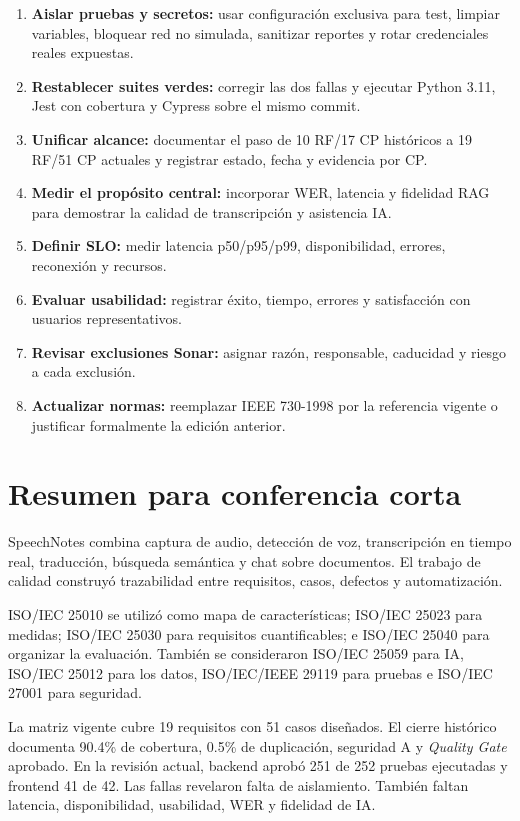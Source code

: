\begin{enumerate}
    \item \textbf{Aislar pruebas y secretos:} usar configuración exclusiva para
    test, limpiar variables, bloquear red no simulada, sanitizar reportes y rotar
    credenciales reales expuestas.
    \item \textbf{Restablecer suites verdes:} corregir las dos fallas y ejecutar
    Python 3.11, Jest con cobertura y Cypress sobre el mismo commit.
    \item \textbf{Unificar alcance:} documentar el paso de 10 RF/17 CP históricos
    a 19 RF/51 CP actuales y registrar estado, fecha y evidencia por CP.
    \item \textbf{Medir el propósito central:} incorporar WER, latencia y fidelidad
    RAG para demostrar la calidad de transcripción y asistencia IA.
    \item \textbf{Definir SLO:} medir latencia p50/p95/p99, disponibilidad,
    errores, reconexión y recursos.
    \item \textbf{Evaluar usabilidad:} registrar éxito, tiempo, errores y
    satisfacción con usuarios representativos.
    \item \textbf{Revisar exclusiones Sonar:} asignar razón, responsable,
    caducidad y riesgo a cada exclusión.
    \item \textbf{Actualizar normas:} reemplazar IEEE 730-1998 por la referencia
    vigente o justificar formalmente la edición anterior.
\end{enumerate}

\section{Resumen para conferencia corta}

SpeechNotes combina captura de audio, detección de voz, transcripción en tiempo
real, traducción, búsqueda semántica y chat sobre documentos. El trabajo de
calidad construyó trazabilidad entre requisitos, casos, defectos y automatización.

ISO/IEC 25010 se utilizó como mapa de características; ISO/IEC 25023 para medidas;
ISO/IEC 25030 para requisitos cuantificables; e ISO/IEC 25040 para organizar la
evaluación. También se consideraron ISO/IEC 25059 para IA, ISO/IEC 25012 para los
datos, ISO/IEC/IEEE 29119 para pruebas e ISO/IEC 27001 para seguridad.

La matriz vigente cubre 19 requisitos con 51 casos diseñados. El cierre histórico
documenta 90.4\% de cobertura, 0.5\% de duplicación, seguridad A y \textit{Quality
Gate} aprobado. En la revisión actual, backend aprobó 251 de 252 pruebas ejecutadas
y frontend 41 de 42. Las fallas revelaron falta de aislamiento. También faltan
latencia, disponibilidad, usabilidad, WER y fidelidad de IA.

